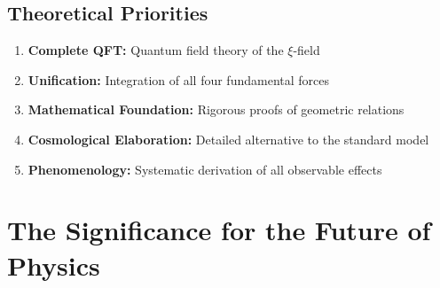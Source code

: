 \documentclass[12pt,a4paper]{article}
\begin{document}
	\subsection{Theoretical Priorities}
	
	\begin{enumerate}
		\item \textbf{Complete QFT:} Quantum field theory of the $\xi$-field
		\item \textbf{Unification:} Integration of all four fundamental forces
		\item \textbf{Mathematical Foundation:} Rigorous proofs of geometric relations
		\item \textbf{Cosmological Elaboration:} Detailed alternative to the standard model
		\item \textbf{Phenomenology:} Systematic derivation of all observable effects
	\end{enumerate}
	
	
	
	\section{The Significance for the Future of Physics}
	
\end{document}
